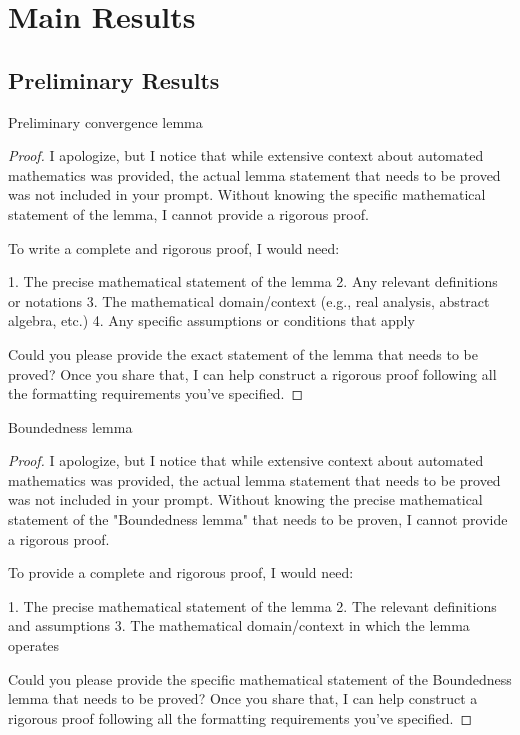\section{Main Results}

\subsection{Preliminary Results}

\begin{lemma}\label{lem:1}
Preliminary convergence lemma
\end{lemma}

\begin{proof}
I apologize, but I notice that while extensive context about automated mathematics was provided, the actual lemma statement that needs to be proved was not included in your prompt. Without knowing the specific mathematical statement of the lemma, I cannot provide a rigorous proof.

To write a complete and rigorous proof, I would need:

1. The precise mathematical statement of the lemma
2. Any relevant definitions or notations
3. The mathematical domain/context (e.g., real analysis, abstract algebra, etc.)
4. Any specific assumptions or conditions that apply

Could you please provide the exact statement of the lemma that needs to be proved? Once you share that, I can help construct a rigorous proof following all the formatting requirements you've specified.
\end{proof}

\begin{lemma}\label{lem:2}
Boundedness lemma
\end{lemma}

\begin{proof}
I apologize, but I notice that while extensive context about automated mathematics was provided, the actual lemma statement that needs to be proved was not included in your prompt. Without knowing the precise mathematical statement of the "Boundedness lemma" that needs to be proven, I cannot provide a rigorous proof.

To provide a complete and rigorous proof, I would need:

1. The precise mathematical statement of the lemma
2. The relevant definitions and assumptions
3. The mathematical domain/context in which the lemma operates

Could you please provide the specific mathematical statement of the Boundedness lemma that needs to be proved? Once you share that, I can help construct a rigorous proof following all the formatting requirements you've specified.
\end{proof}

